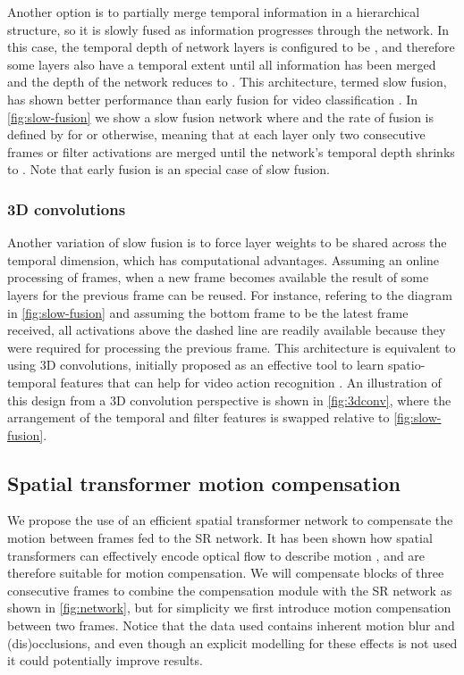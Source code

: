 \documentclass[10pt,twocolumn,letterpaper]{article}
\begin{document}
Another option is to partially merge temporal information in a hierarchical structure, so it is slowly fused as information progresses through the network. In this case, the temporal depth of network layers is configured to be , and therefore some layers also have a temporal extent until all information has been merged and the depth of the network reduces to . This architecture, termed slow fusion, has shown better performance than early fusion for video classification \cite{Karpathy2014a}. In \cref{fig:slow-fusion} we show a slow fusion network where  and the rate of fusion is defined by  for  or  otherwise, meaning that at each layer only two consecutive frames or filter activations are merged until the network's temporal depth shrinks to . Note that early fusion is an special case of slow fusion.



\subsubsection{3D convolutions}

Another variation of slow fusion is to force layer weights to be shared across the temporal dimension, which has computational advantages. Assuming an online processing of frames, when a new frame becomes available the result of some layers for the previous frame can be reused. For instance, refering to the diagram in \cref{fig:slow-fusion} and assuming the bottom frame to be the latest frame received, all activations above the dashed line are readily available because they were required for processing the previous frame. This architecture is equivalent to using 3D convolutions, initially proposed as an effective tool to learn spatio-temporal features that can help for video action recognition \cite{Tran2015}. An illustration of this design from a 3D convolution perspective is shown in \cref{fig:3dconv}, where the arrangement of the temporal and filter features is swapped relative to \cref{fig:slow-fusion}.



\subsection{Spatial transformer motion compensation}\label{sec:transformer}

We propose the use of an efficient spatial transformer network to compensate the motion between frames fed to the \gls{SR} network. It has been shown how spatial transformers can effectively encode optical flow to describe motion \cite{Patraucean2016a, Ahmadi2016, Handa2016}, and are therefore suitable for motion compensation. We will compensate blocks of three consecutive frames to combine the compensation module with the \gls{SR} network as shown in \cref{fig:network}, but for simplicity we first introduce motion compensation between two frames. Notice that the data used contains inherent motion blur and (dis)occlusions, and even though an explicit modelling for these effects is not used it could potentially improve results.
\end{document}
